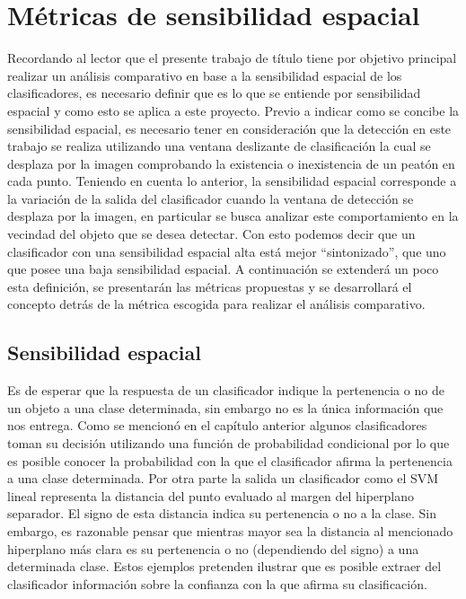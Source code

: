 
\chapter{M\'etricas de sensibilidad espacial}
\label{cap:metricas}

Recordando al lector que el presente trabajo de título tiene por objetivo principal realizar un análisis comparativo en base a la sensibilidad espacial de los clasificadores, es necesario definir que es lo que se entiende por sensibilidad espacial y como esto se aplica a este proyecto. Previo a indicar como se concibe la sensibilidad espacial, es necesario tener en consideración que la detección en este trabajo se realiza utilizando una ventana deslizante de clasificación la cual se desplaza por la imagen comprobando la existencia o inexistencia de un peatón en cada punto. 
Teniendo en cuenta lo anterior, la sensibilidad espacial corresponde a la variación de la salida del clasificador cuando la ventana de detección se desplaza por la imagen, en particular se busca analizar este comportamiento en la vecindad del objeto que se desea detectar. Con esto podemos decir que un clasificador con una sensibilidad espacial alta está mejor ``sintonizado'', que uno que posee una baja sensibilidad espacial. A continuación se extenderá un poco esta definición, se presentarán las métricas propuestas y se desarrollará el concepto detrás de la métrica escogida para realizar el análisis comparativo.

\section{Sensibilidad espacial}
\label{metricas:sensibilidad}

Es de esperar que la respuesta de un clasificador indique la pertenencia o no de un objeto a una clase determinada, sin embargo no es la única información que nos 
entrega. Como se mencionó en el capítulo anterior algunos clasificadores toman su decisión utilizando una función de probabilidad condicional por lo que es posible conocer la probabilidad con la que el clasificador afirma la pertenencia a una clase determinada. Por otra parte la salida un clasificador como el SVM lineal representa la distancia del punto evaluado al margen del hiperplano separador. El signo de esta distancia indica su pertenencia o no a la clase. Sin embargo, es razonable pensar que mientras mayor sea la distancia al mencionado hiperplano más clara es su pertenencia o no (dependiendo del signo) a una determinada clase. Estos ejemplos pretenden ilustrar que es posible extraer del clasificador información sobre la confianza con la que afirma su clasificación. 

